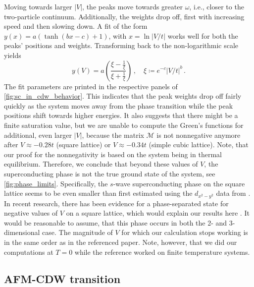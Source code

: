 \documentclass[
    reprint, 
    aps,
    preprintnumbers,
    twocolumn,
    prb,
    superscriptaddress
]{revtex4-2}
\newcommand{\mM}{\mathcal{M}}
\begin{document}
Moving towards larger $|V|$, the peaks move towards greater $\omega$, i.e., closer to the two-particle continuum.
Additionally, the weights drop off, first with increasing speed and then slowing down.
A fit of the form $y(x) = a (\tanh (bx - c) + 1)$, with $x=\ln|V/t|$ works well for both the peaks' positions and weights.
Transforming back to the non-logarithmic scale yields
\begin{equation}
    y(V) = a \left( \frac{ \xi - \frac{1}{\xi} }{ \xi + \frac{1}{\xi} } \right)\,,\quad \xi \coloneqq e^{-c} |V/t|^b\,.
\end{equation}
The fit parameters are printed in the respective panels of \autoref{fig:sc_in_cdw_behavior}.
This indicates that the peak weights drop off fairly quickly as the system moves away from the phase transition while the peak positions shift towards higher energies.
It also suggests that there might be a finite saturation value, but we are unable to compute the Green's functions for additional, even larger $|V|$, 
because the matrix $\mM$ is not nonnegative anymore after $V\approx -0.28t$ (square lattice) or $V\approx -0.34t$ (simple cubic lattice).
Note, that our proof for the nonnegativity is based on the system being in thermal equilibrium.
Therefore, we conclude that beyond these values of $V$, the superconducting phase is not the true ground state of the system, see \autoref{fig:phase_limits}.
Specifically, the $s$-wave superconducting phase on the square lattice seems to be even smaller than first estimated using the $d_{x^2 -y^2}$ data from \cite{Micnas88b}.
In recent research, there has been evidence for a phase-separated state for negative values of $V$ on a square lattice, which would explain our results here \cite{Linner23}.
It would be reasonable to assume, that this phase occurs in both the 2- and 3-dimensional case.
The magnitude of $V$ for which our calculation stops working is in the same order as in the referenced paper.
Note, however, that we did our computations at $T=0$ while the reference worked on finite temperature systems.



\subsection{AFM-CDW transition}
\end{document}
